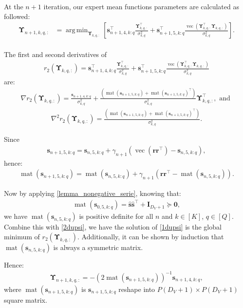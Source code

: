 \documentclass{article}
\newcommand{\zero}{\ensuremath{\mathbf{0}}}
\DeclareMathOperator*{\vect}{vec} %
\DeclareMathOperator*{\mat}{mat}
\def\vr{{\bm{r}}}
\def\vs{{\bm{s}}}
\def\mI{{\bm{I}}}
\def\mUpsilon{{\bm{\Upsilon}}}
\DeclareMathOperator*{\argmin}{arg\,min}
\begin{document}
At the $n+1$ iteration, our expert mean functions parameters are calculated as followed:
\begin{align*}
    \mUpsilon_{n+1,k,q,:}&=\displaystyle\argmin_{\mUpsilon_{k,q,:}}\left[\vs_{n+1,4,k:q}^{\top}\frac{\mUpsilon_{k,q,:}^{\top}}{\sigma_{k,q}^2}+\vs_{n+1,5,k:q}^{\top}\frac{\vect(\mUpsilon_{k,q,:}^{\top}\mUpsilon_{k,q,:})}{\sigma_{k,q}^2}\right].\\   
\end{align*}
\par The first and second derivatives of 
\begin{align*}
    r_2(\mUpsilon_{k,q,:})=\vs_{n+1,4,k:q}^{\top}\frac{\mUpsilon_{k,q,:}^{\top}}{\sigma_{k,q}^2}+\vs_{n+1,5,k:q}^{\top}\frac{\vect(\mUpsilon_{k,q,:}^{\top}\mUpsilon_{k,q,:})}{\sigma_{k,q}^2}
\end{align*} are:
\begin{align} \label{1dupsi}
        \nabla r_2(\mUpsilon_{k,q,:})=\frac{\vs_{n+1,4,k:q}}{\sigma_{k,q}^{2}}+\frac{\left(\mat\left(\vs_{n+1,5,k:q}\right)+\mat\left(\vs_{n+1,5,k:q}\right)^{\top}\right)}{\sigma_{k,q}^{2}}\mUpsilon_{k,q,:}^{\top}, \text{ and } 
\end{align}
\begin{align} \label{2dupsi}
    \nabla^2 r_2(\mUpsilon_{k,q,:})=\frac{\left(\mat\left(\vs_{n+1,5,k:q}\right)+\mat\left(\vs_{n+1,5,k:q}\right)^{\top}\right)}{\sigma_{k,q}^{2}}.
\end{align}
\par Since
\begin{align*}
    \vs_{n+1,5,k:q}=\vs_{n,5,k:q}+\gamma_{n+1}\left(\vect\left(\vr\vr^{\top}\right)-\vs_{n,5,k:q}\right),
\end{align*}
hence:
\begin{align*}
    \mat(\vs_{n+1,5,k:q})=\mat(\vs_{n,5,k:q})+\gamma_{n+1}\left(\vr\vr^{\top}-\mat(\vs_{n,5,k:q})\right).
\end{align*}
\par Now by applying \cref{lemma_nonegative_serie}, knowing that:
\begin{align*}
\mat(\vs_{0,5,k:q})=\widehat{\vs}\widehat{\vs}^{\top}+\mI_{D_{V}+1}\succeq \zero,
\end{align*}
we have $\mat(\vs_{n,5,k:q})$ is positive definite for all $n$ and $k \in [K]$, $q\in [Q]$. Combine this with \cref{2dupsi}, we have the solution of \cref{1dupsi} is the global minimum of $r_2(\mUpsilon_{k,q,:})$. Additionally, it can be shown by induction that $\mat(\vs_{n,5,k:q})$ is always a symmetric matrix. 
\par
Hence: 
\begin{align*}
\mUpsilon_{n+1,k,q,:}=-\left(2\mat\left(\vs_{n+1,5,k:q}\right)\right)^{-1}\vs_{n+1,4,k:q},
\end{align*}
where $\mat(\vs_{n+1,5,k:q})$ is $\vs_{n+1,5,k:q}$ reshape into $P(D_{V}+1) \times P(D_{V}+1)$ square matrix.
\end{document}
